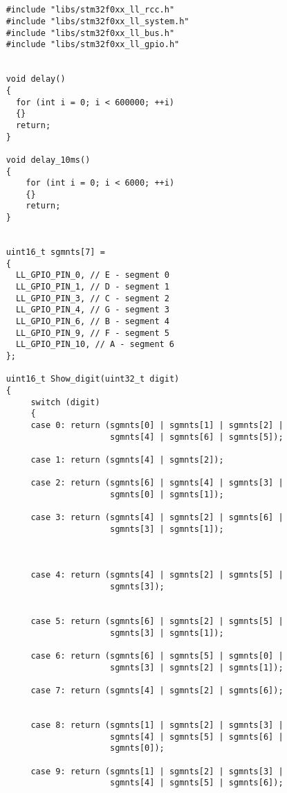 
\begin{verbatim}
    
    
    #include "libs/stm32f0xx_ll_rcc.h"
    #include "libs/stm32f0xx_ll_system.h"
    #include "libs/stm32f0xx_ll_bus.h"
    #include "libs/stm32f0xx_ll_gpio.h"
    
    
    void delay()
    {
      for (int i = 0; i < 600000; ++i)
      {}
      return;
    }
    
    void delay_10ms()
    {
        for (int i = 0; i < 6000; ++i)
        {}
        return;
    }
    
    
    uint16_t sgmnts[7] =
    { 
      LL_GPIO_PIN_0, // E - segment 0
      LL_GPIO_PIN_1, // D - segment 1
      LL_GPIO_PIN_3, // C - segment 2
      LL_GPIO_PIN_4, // G - segment 3
      LL_GPIO_PIN_6, // B - segment 4
      LL_GPIO_PIN_9, // F - segment 5 
      LL_GPIO_PIN_10, // A - segment 6
    };
    
    uint16_t Show_digit(uint32_t digit)
    {
         switch (digit)
         {
         case 0: return (sgmnts[0] | sgmnts[1] | sgmnts[2] |
                         sgmnts[4] | sgmnts[6] | sgmnts[5]);
                 
         case 1: return (sgmnts[4] | sgmnts[2]);
         
         case 2: return (sgmnts[6] | sgmnts[4] | sgmnts[3] |
                         sgmnts[0] | sgmnts[1]);
                 
         case 3: return (sgmnts[4] | sgmnts[2] | sgmnts[6] | 
                         sgmnts[3] | sgmnts[1]);
                         
         
      
         case 4: return (sgmnts[4] | sgmnts[2] | sgmnts[5] | 
                         sgmnts[3]);
                 
                 
         case 5: return (sgmnts[6] | sgmnts[2] | sgmnts[5] | 
                         sgmnts[3] | sgmnts[1]);
                 
         case 6: return (sgmnts[6] | sgmnts[5] | sgmnts[0] |
                         sgmnts[3] | sgmnts[2] | sgmnts[1]);
                 
         case 7: return (sgmnts[4] | sgmnts[2] | sgmnts[6]);
                         
                 
         case 8: return (sgmnts[1] | sgmnts[2] | sgmnts[3] |
                         sgmnts[4] | sgmnts[5] | sgmnts[6] |
                         sgmnts[0]);
           
         case 9: return (sgmnts[1] | sgmnts[2] | sgmnts[3] |
                         sgmnts[4] | sgmnts[5] | sgmnts[6]);
                 

\end{verbatim}
